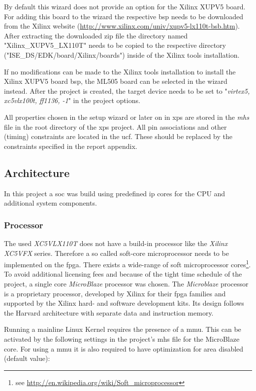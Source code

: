 By default this wizard does not provide an option for the Xilinx XUPV5 board. For adding this board to the wizard the respective \gls{bsp} needs to be downloaded from the Xilinx website (\url{http://www.xilinx.com/univ/xupv5-lx110t-bsb.htm}). After extracting the downloaded zip file the directory named "Xilinx\_XUPV5\_LX110T" needs to be copied to the respective directory ("ISE\_DS/EDK/board/Xilinx/boards") inside of the Xilinx tools installation.

If no modifications can be made to the Xilinx tools installation to install the Xilinx XUPV5 board \gls{bsp}, the ML505 board can be selected in the wizard instead. After the project is created, the target device needs to be set to "\textit{virtex5, xc5vlx100t, ff1136, -1}" in the project options.

All properties chosen in the setup wizard or later on in \gls{xps} are stored in the \textit{\gls{mhs}} file in the root directory of the \gls{xps} project. All pin associations and other (timing) constraints are located in the \gls{ucf}. These should be replaced by the constraints specified in the report appendix.

\subsection{Architecture}

In this project a \gls{soc} was build using predefined \gls{ip} cores for the CPU and additional system components.

\subsubsection{Processor}

The used \textit{XC5VLX110T} does not have a build-in processor like the \textit{Xilinx XC5VFX} series. Therefore a so called soft-core microprocessor needs to be implemented on the \gls{fpga}. There exists a wide-range of soft microprocessor cores\footnote{see \url{http://en.wikipedia.org/wiki/Soft_microprocessor}}. To avoid additional licensing fees and because of the tight time schedule of the project, a single core \textit{MicroBlaze} processor was chosen. The \textit{Microblaze} processor is a proprietary processor, developed by Xilinx for their \gls{fpga} families and supported by the Xilinx hard- and software development kits. Its design follows the Harvard architecture with separate data and instruction memory.

Running a mainline Linux Kernel requires the presence of a \gls{mmu}. This can be activated by the following settings in the project's \gls{mhs} file for the MicroBlaze core. For using a \gls{mmu} it is also required to have optimization for area disabled (default value):

